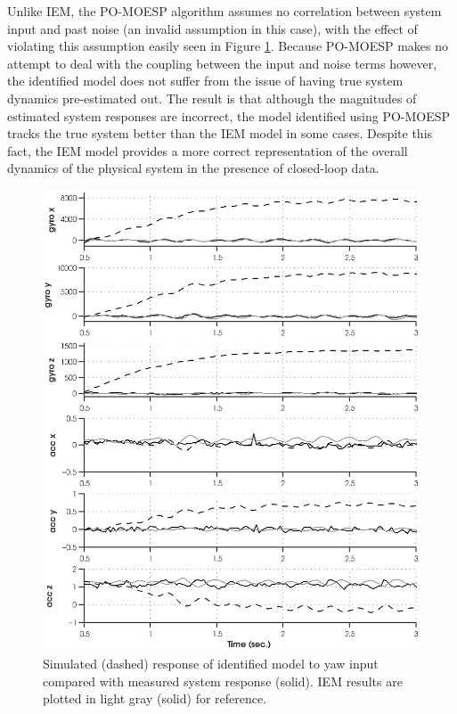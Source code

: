 Unlike IEM, the PO-MOESP algorithm assumes no correlation between system input and past noise (an invalid assumption in this case), with the effect of violating this assumption easily seen in Figure \ref{sim_1760_moesp.eps}. Because PO-MOESP makes no attempt to deal with the coupling between the input and noise terms however, the identified model does not suffer from the issue of having true system dynamics pre-estimated out. The result is that although the magnitudes of estimated system responses are incorrect, the model identified using PO-MOESP tracks the true system better than the IEM model in some cases. Despite this fact, the IEM model provides a more correct representation of the overall dynamics of the physical system in the presence of closed-loop data.

\newpage
\begin{figure}[htb!]
	\centering
	\includegraphics{../fig/sim_1760_moesp.eps}
	\caption{Simulated (dashed) response of identified model to yaw input compared with measured system response (solid). IEM results are plotted in light gray (solid) for reference.}
	\label{sim_1760_moesp.eps}
\end{figure}\clearpage











